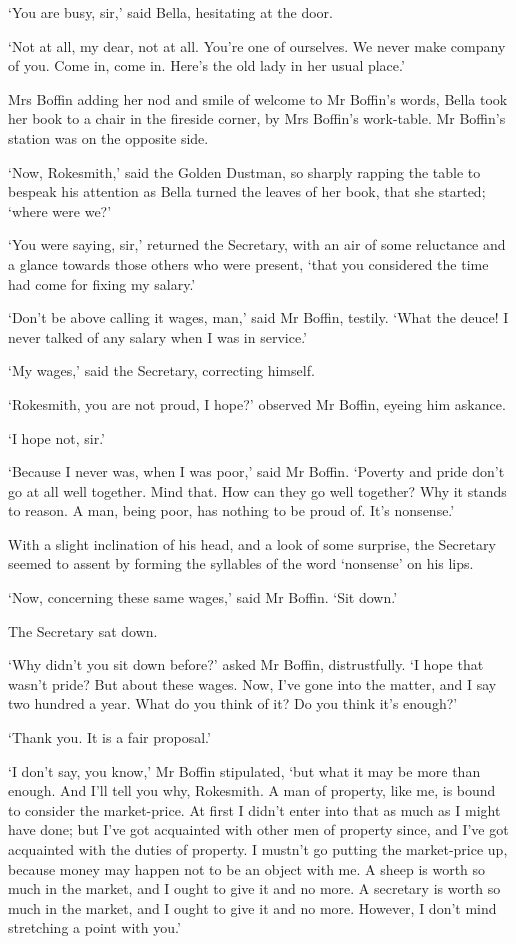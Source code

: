 ‘You are busy, sir,’ said Bella, hesitating at the door.

‘Not at all, my dear, not at all. You’re one of ourselves. We never
make company of you. Come in, come in. Here’s the old lady in her usual
place.’

Mrs Boffin adding her nod and smile of welcome to Mr Boffin’s words,
Bella took her book to a chair in the fireside corner, by Mrs Boffin’s
work-table. Mr Boffin’s station was on the opposite side.

‘Now, Rokesmith,’ said the Golden Dustman, so sharply rapping the table
to bespeak his attention as Bella turned the leaves of her book, that
she started; ‘where were we?’

‘You were saying, sir,’ returned the Secretary, with an air of some
reluctance and a glance towards those others who were present, ‘that you
considered the time had come for fixing my salary.’

‘Don’t be above calling it wages, man,’ said Mr Boffin, testily. ‘What
the deuce! I never talked of any salary when I was in service.’

‘My wages,’ said the Secretary, correcting himself.

‘Rokesmith, you are not proud, I hope?’ observed Mr Boffin, eyeing him
askance.

‘I hope not, sir.’

‘Because I never was, when I was poor,’ said Mr Boffin. ‘Poverty and
pride don’t go at all well together. Mind that. How can they go well
together? Why it stands to reason. A man, being poor, has nothing to be
proud of. It’s nonsense.’

With a slight inclination of his head, and a look of some surprise,
the Secretary seemed to assent by forming the syllables of the word
‘nonsense’ on his lips.

‘Now, concerning these same wages,’ said Mr Boffin. ‘Sit down.’

The Secretary sat down.

‘Why didn’t you sit down before?’ asked Mr Boffin, distrustfully. ‘I
hope that wasn’t pride? But about these wages. Now, I’ve gone into the
matter, and I say two hundred a year. What do you think of it? Do you
think it’s enough?’

‘Thank you. It is a fair proposal.’

‘I don’t say, you know,’ Mr Boffin stipulated, ‘but what it may be more
than enough. And I’ll tell you why, Rokesmith. A man of property, like
me, is bound to consider the market-price. At first I didn’t enter into
that as much as I might have done; but I’ve got acquainted with other
men of property since, and I’ve got acquainted with the duties of
property. I mustn’t go putting the market-price up, because money may
happen not to be an object with me. A sheep is worth so much in the
market, and I ought to give it and no more. A secretary is worth so much
in the market, and I ought to give it and no more. However, I don’t mind
stretching a point with you.’

